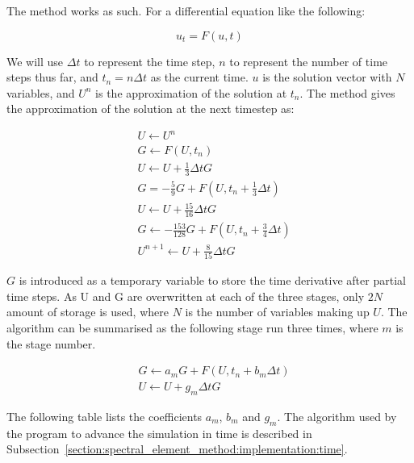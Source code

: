 The method works as such. For a differential equation like the following:

\begin{equation}
	u_t = F(u, t)
\end{equation}

We will use $\Delta t$ to represent the time step, $n$ to represent the number of time steps thus
far, and $t_n = n \Delta t$ as the current time. $u$ is the solution vector with $N$ variables, and
$U^n$ is the approximation of the solution at $t_n$. The method gives the approximation of the
solution at the next timestep as:

\begin{equation} \label{equ:runge_kutta}
	\begin{split}
		& U \leftarrow U^n \\
		& G \leftarrow F \left( U, t_n \right) \\
		& U \leftarrow U + \frac{1}{3} \Delta t G \\
		& G = -\frac{5}{9} G + F \left( U, t_n + \frac{1}{3} \Delta t \right) \\
		& U \leftarrow U + \frac{15}{16} \Delta t G \\
		& G \leftarrow -\frac{153}{128} G + F \left( U, t_n + \frac{3}{4} \Delta t \right) \\
		& U^{n + 1} \leftarrow U + \frac{8}{15} \Delta t G
	\end{split}
\end{equation}

$G$ is introduced as a temporary variable to store the time derivative after partial time steps. As
U and G are overwritten at each of the three stages, only $2 N$ amount of storage is used, where $N$
is the number of variables making up $U$. The algorithm can be summarised as the following stage run
three times, where $m$ is the stage number.

\begin{equation} \label{equ:runge_kutta_stage}
	\begin{split}
		& G \leftarrow a_m G + F \left( U, t_n + b_m \Delta t \right) \\
		& U \leftarrow U + g_m \Delta t G
	\end{split}
\end{equation}

The following table lists the coefficients $a_m$, $b_m$ and $g_m$. The algorithm used by the program
to advance the simulation in time is described in
Subsection~\ref{section:spectral_element_method:implementation:time}. 

